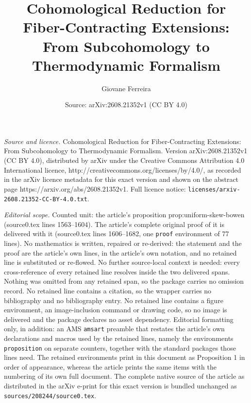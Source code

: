 \documentclass[10pt,a4paper]{amsart}
\title{Cohomological Reduction for Fiber-Contracting Extensions:\\ From Subcohomology to Thermodynamic Formalism}
\author{Giovane Ferreira}
\date{Source: arXiv:2608.21352v1 (CC BY 4.0)}
\begin{document}
\maketitle

\noindent\emph{Source and licence.} Cohomological Reduction for Fiber-Contracting Extensions:\\ From Subcohomology to Thermodynamic Formalism. Version arXiv:2608.21352v1 (CC BY 4.0), distributed by arXiv under the Creative Commons Attribution 4.0 International licence, http://creativecommons.org/licenses/by/4.0/, as recorded in the arXiv licence metadata for this exact version and shown on the abstract page https://arxiv.org/abs/2608.21352v1. Full licence notice: \texttt{licenses/arxiv-2608.21352-CC-BY-4.0.txt}.\par\smallskip

\noindent\textit{Editorial scope.} Counted unit: the article's proposition prop:uniform-skew-bowen (source0.tex lines 1563--1604). The article's complete original proof of it is delivered with it (source0.tex lines 1606--1682, one \texttt{proof} environment of 77 lines). No mathematics is written, repaired or re-derived: the statement and the proof are the article's own lines, in the article's own notation, and no retained line is substituted or re-flowed.  No further source-local context is needed: every cross-reference of every retained line resolves inside the two delivered spans.  Nothing was omitted from any retained span, so the package carries no omission record.  No retained line contains a citation, so the wrapper carries no bibliography and no bibliography entry.  No retained line contains a figure environment, an image-inclusion command or drawing code, so no image is delivered and the package declares no asset dependency.  Editorial formatting only, in addition: an AMS \texttt{amsart} preamble that restates the article's own declarations and macros used by the retained lines, namely the environments \texttt{proposition} on separate counters, together with the standard packages those lines need.  The retained environments print in this document as Proposition 1 in order of appearance, whereas the article prints the same items with the numbering of its own full document.  The complete native source of the article as distributed in the arXiv e-print for this exact version is bundled unchanged as \texttt{sources/208244/source0.tex}.
\end{document}
